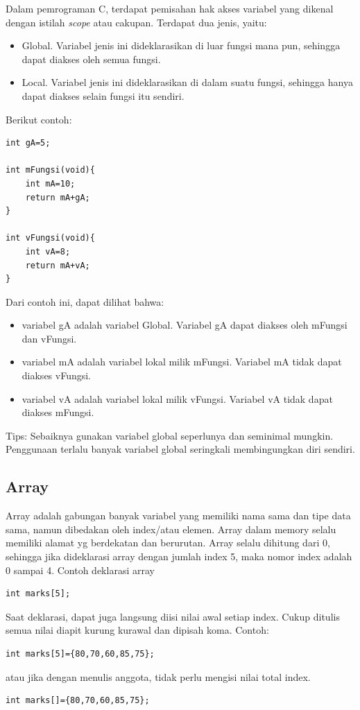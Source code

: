 \documentclass[12pt,]{article}
\begin{document}
	Dalam pemrograman C, terdapat pemisahan hak akses variabel yang dikenal dengan istilah \textit{scope} atau cakupan.
	Terdapat dua jenis, yaitu:
	\begin{itemize}
		\item Global. Variabel jenis ini dideklarasikan di luar fungsi mana pun, sehingga dapat diakses oleh semua fungsi.
		\item Local. Variabel jenis ini dideklarasikan di dalam suatu fungsi, sehingga hanya dapat diakses selain fungsi itu sendiri.
	\end{itemize}
	 Berikut contoh:
	 \begin{verbatim}
int gA=5;

int mFungsi(void){
	int mA=10;
	return mA+gA;
}

int vFungsi(void){
	int vA=8;
	return mA+vA;
}
	 \end{verbatim}
	 
	 Dari contoh ini, dapat dilihat bahwa:
	 \begin{itemize}
	 	\item variabel gA adalah variabel Global.
	 	Variabel gA dapat diakses oleh mFungsi dan vFungsi.
	 	
	 	\item variabel mA adalah variabel lokal milik mFungsi.
	 	Variabel mA tidak dapat diakses vFungsi.
	 	
	 	\item variabel vA adalah variabel lokal milik vFungsi.
	 	Variabel vA tidak dapat diakses mFungsi.
	 \end{itemize}
 
 	Tips: Sebaiknya gunakan variabel global seperlunya dan seminimal mungkin.
 	Penggunaan terlalu banyak variabel global seringkali membingungkan diri sendiri.
	
	\newpage
	\subsection{Array}
	
	Array adalah gabungan banyak variabel yang memiliki nama sama dan tipe data sama, namun dibedakan oleh index/atau elemen.
	Array dalam memory selalu memiliki alamat yg berdekatan dan berurutan.
	Array selalu dihitung dari 0, sehingga jika dideklarasi array dengan jumlah index 5, maka nomor index adalah 0 sampai 4.
	Contoh deklarasi array
\begin{verbatim}
int marks[5];
\end{verbatim}
	Saat deklarasi, dapat juga langsung diisi nilai awal setiap index.
	Cukup ditulis semua nilai diapit kurung kurawal dan dipisah koma.
	Contoh:
\begin{verbatim}
int marks[5]={80,70,60,85,75};
\end{verbatim}
	atau jika dengan menulis anggota, tidak perlu mengisi nilai total index.
	\begin{verbatim}
int marks[]={80,70,60,85,75};
	\end{verbatim}
	
\end{document}
